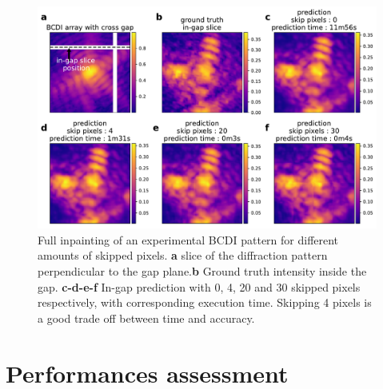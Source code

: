 \begin{figure}[h]
    \centering
    \includegraphics[width=\textwidth]{figures/Inpainting/Skip_pixels_ingap_slice.pdf}
    \caption{Full inpainting of an experimental BCDI pattern for different amounts of skipped pixels. \textbf{a}
    slice of the diffraction pattern perpendicular to the gap plane.\textbf{b} Ground truth intensity inside the gap.
    \textbf{c-d-e-f} In-gap prediction with 0, 4, 20 and 30 skipped pixels respectively, with corresponding 
    execution time. Skipping 4 pixels is a good trade off between time and accuracy.}
    \label{fig:skip_figure}
\end{figure}

\section{Performances assessment}\label{sec:performances}

